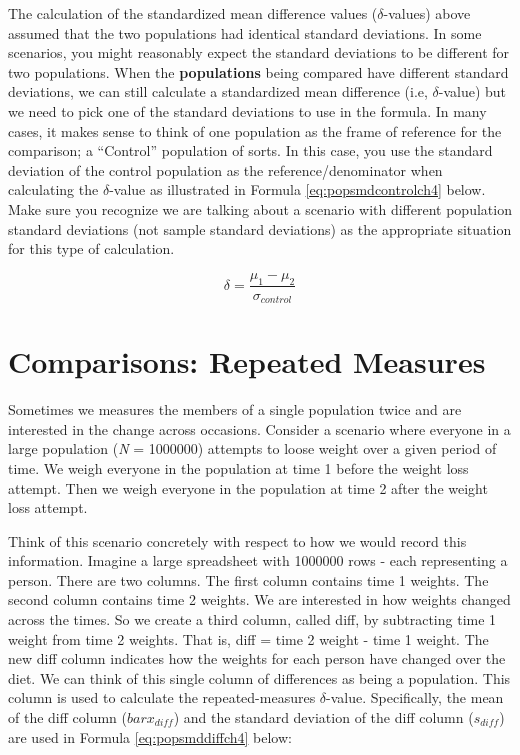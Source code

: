 \documentclass[
]{krantz}
\begin{document}
The calculation of the standardized mean difference values (\(\delta\)-values) above assumed that the two populations had identical standard deviations. In some scenarios, you might reasonably expect the standard deviations to be different for two populations. When the \textbf{populations} being compared have different standard deviations, we can still calculate a standardized mean difference (i.e, \(\delta\)-value) but we need to pick one of the standard deviations to use in the formula. In many cases, it makes sense to think of one population as the frame of reference for the comparison; a ``Control'' population of sorts. In this case, you use the standard deviation of the control population as the reference/denominator when calculating the \(\delta\)-value as illustrated in Formula \eqref{eq:popsmdcontrolch4} below. Make sure you recognize we are talking about a scenario with different population standard deviations (not sample standard deviations) as the appropriate situation for this type of calculation.

\begin{equation} 
\delta =  \frac{\mu_{1} - \mu_{2}}{\sigma_{control}}
      \label{eq:popsmdcontrolch4}
\end{equation}

\hypertarget{comparisons-repeated-measures}{%
\section{Comparisons: Repeated Measures}\label{comparisons-repeated-measures}}

Sometimes we measures the members of a single population twice and are interested in the change across occasions. Consider a scenario where everyone in a large population (\emph{N} = 1000000) attempts to loose weight over a given period of time. We weigh everyone in the population at time 1 before the weight loss attempt. Then we weigh everyone in the population at time 2 after the weight loss attempt.

Think of this scenario concretely with respect to how we would record this information. Imagine a large spreadsheet with 1000000 rows - each representing a person. There are two columns. The first column contains time 1 weights. The second column contains time 2 weights. We are interested in how weights changed across the times. So we create a third column, called diff, by subtracting time 1 weight from time 2 weights. That is, diff = time 2 weight - time 1 weight. The new diff column indicates how the weights for each person have changed over the diet. We can think of this single column of differences as being a population. This column is used to calculate the repeated-measures \(\delta\)-value. Specifically, the mean of the diff column (\(bar{x}_{diff}\)) and the standard deviation of the diff column (\(s_{diff}\)) are used in Formula \eqref{eq:popsmddiffch4} below:
\end{document}
